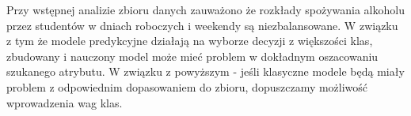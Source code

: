 Przy wstępnej analizie zbioru danych zauważono że rozkłady spożywania alkoholu przez studentów w dniach roboczych i weekendy są niezbalansowane. W związku z tym że modele predykcyjne działają na wyborze decyzji z większości klas, zbudowany i nauczony model może mieć problem w dokładnym oszacowaniu szukanego atrybutu. W związku z powyższym - jeśli klasyczne modele będą miały problem z odpowiednim dopasowaniem do zbioru, dopuszczamy możliwość wprowadzenia wag klas.
